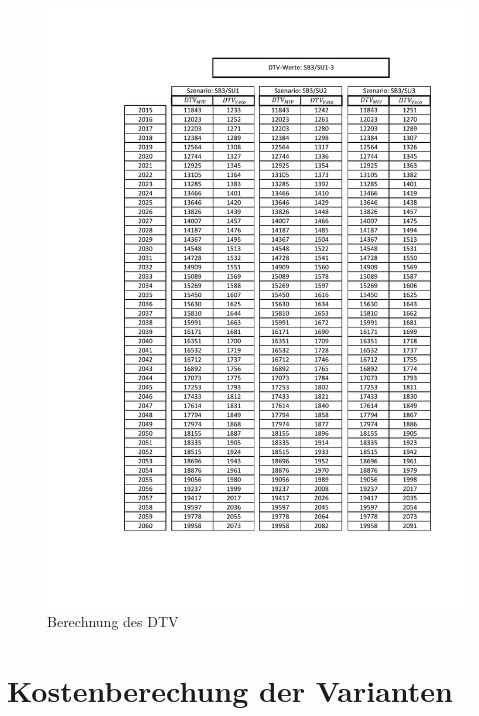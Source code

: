 \begin{figure}[h!]
	\centering
	\includegraphics[width=\textwidth]{figures/f-00-10-01-DTV-Modellierung}
	\caption{Berechnung des DTV}
	\label{img:DTVModellierung}
\end{figure}


\section{Kostenberechung der Varianten}
\label{sec:Ahangkostenberechnug}



\printindex



